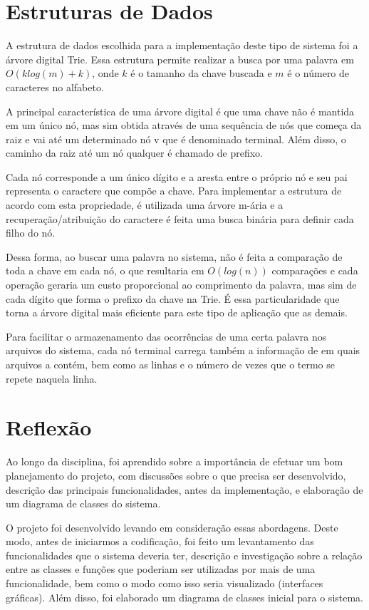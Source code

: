 \documentclass[12pt]{article}
\begin{document}
\section{Estruturas de Dados}

A estrutura de dados escolhida para a implementação deste tipo de sistema foi a árvore digital Trie. Essa estrutura permite realizar a busca por uma palavra em $O(k log(m) + k)$, onde $k$ é o tamanho da chave buscada e $m$ é o número de caracteres no alfabeto.

A principal característica de uma árvore digital é que uma chave não é mantida em um único nó, mas sim obtida através de uma sequência de nós que começa da raiz e vai até um determinado nó v que é denominado terminal. Além disso, o caminho da raiz até um nó qualquer é chamado de prefixo.
 
Cada nó corresponde a um único dígito e a aresta entre o próprio nó e seu pai representa o caractere que compõe a chave. Para implementar a estrutura de acordo com esta propriedade, é utilizada uma árvore m-ária e a recuperação/atribuição do caractere é feita uma busca binária para definir cada filho do nó.

Dessa forma, ao buscar uma palavra no sistema, não é feita a comparação de toda a chave em cada nó, o que resultaria em $O(log(n))$ comparações e cada operação geraria um custo proporcional ao comprimento da palavra, mas sim de cada dígito que forma o prefixo da chave na Trie. É essa particularidade que torna a árvore digital mais eficiente para este tipo de aplicação que as demais.

Para facilitar o armazenamento das ocorrências de uma certa palavra nos arquivos do sistema, cada nó terminal carrega também a informação de em quais arquivos a contém, bem como as linhas e o número de vezes que o termo se repete naquela linha.

\section{Reflexão}
Ao longo da disciplina, foi aprendido sobre a importância de efetuar um bom planejamento do projeto, com discussões sobre o que precisa ser desenvolvido, descrição das principais funcionalidades, antes da implementação, e elaboração de um diagrama de classes do sistema.

O projeto foi desenvolvido levando em consideração essas abordagens. Deste modo, antes de iniciarmos a codificação, foi feito um levantamento das funcionalidades que o sistema deveria ter, descrição e investigação sobre a relação entre as classes e funções que poderiam ser utilizadas por mais de uma funcionalidade, bem como o modo como isso seria visualizado (interfaces gráficas). Além disso, foi elaborado um diagrama de classes inicial para o sistema. 
\end{document}
